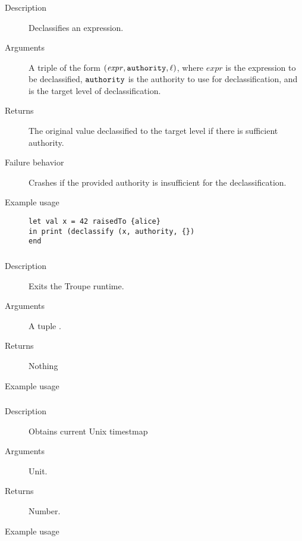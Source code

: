 \subsubsection{}
\begin{description}
    \item [Description] Declassifies an expression.
    \item [Arguments] A triple of the form $(\mathit{expr}, {\mathtt{authority}}, {\mathtt{\ell}} )$, where $\mathit{expr}$ is the expression to be declassified, ${\mathtt{authority}}$ is the authority to use for declassification, and \code{\ell} is the target level of declassification.
    \item [Returns] The original value declassified to the target level if there is sufficient authority. 
    \item [Failure behavior] Crashes if the provided authority is insufficient for the declassification.
    \item [Example usage] 
\begin{minipage}[t]{30em}
\begin{verbatim}
let val x = 42 raisedTo {alice}
in print (declassify (x, authority, {})
end    
\end{verbatim}


 \end{minipage}

    
\end{description}


\subsubsection{}
\begin{description}
    \item [Description] Exits the Troupe runtime.
    \item [Arguments] A tuple .
    \item [Returns] Nothing
    \item [Example usage] 
\end{description}


\subsubsection{}
\begin{description}
    \item [Description] Obtains current Unix timestmap
    \item [Arguments] Unit.
    \item [Returns] Number. 
    \item [Example usage] 
\end{description}


